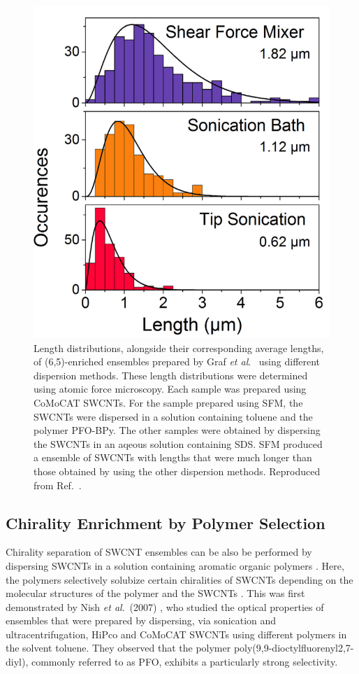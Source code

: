 \begin{figure}[H]
	\centering
	\includegraphics[scale=1.7]{images/chapter_methods/lengths_graf_2}
	\caption{Length distributions, alongside their corresponding average lengths, of (6,5)-enriched ensembles prepared by Graf \textit{et al}.\ \cite{graf2016large} using different dispersion methods. These length distributions were determined using atomic force microscopy. Each sample was prepared using CoMoCAT SWCNTs. For the sample prepared using SFM, the SWCNTs were dispersed in a solution containing toluene and the polymer PFO-BPy. The other samples were obtained by dispersing the SWCNTs in an aqeous solution containing SDS. SFM produced a ensemble of SWCNTs with lengths that were much longer than those obtained by using the other dispersion methods. Reproduced from Ref.\ \cite{graf2016large}.}
	\label{fig:dist_graf}
\end{figure}


\subsection{Chirality Enrichment by Polymer Selection}

Chirality separation of SWCNT ensembles can be also be performed by dispersing SWCNTs in a solution containing aromatic organic polymers \cite{nish2007highly, chen2007toward, tange2011selective}. Here, the polymers selectively solubize certain chiralities of SWCNTs depending on the molecular structures of the polymer and the  SWCNTs \cite{nish2007highly}. This was first demonstrated by Nish \textit{et al}.\ (2007) \cite{nish2007highly}, who studied the optical properties of ensembles that were prepared by dispersing, via sonication and ultracentrifugation, HiPco and CoMoCAT SWCNTs using different polymers in the solvent toluene. They observed that the polymer poly(9,9-dioctylfluorenyl2,7-diyl), commonly referred to as PFO, exhibits a particularly strong selectivity.

